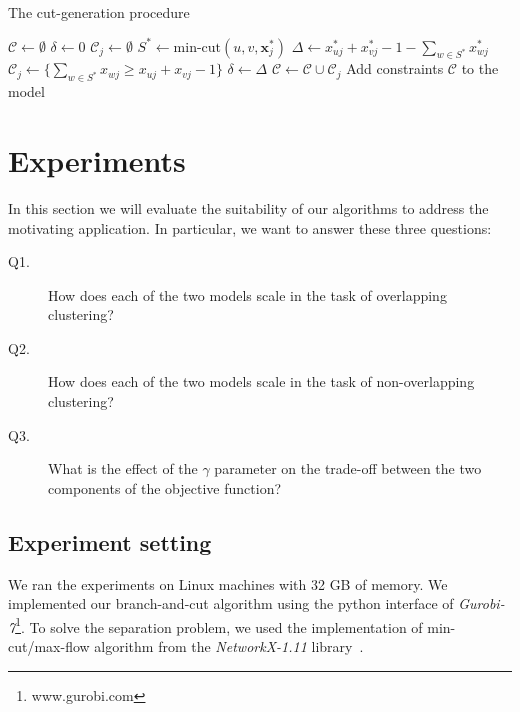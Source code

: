 \documentclass[conference]{IEEEtran}
\begin{document}
\begin{algorithm}
\centering
\caption{The cut-generation procedure}
\label{alg:cut}
\begin{algorithmic}[1]
\State $\mathcal{C} \gets \emptyset$
	\State $\delta \gets 0$
	\State $\mathcal{C}_j \gets \emptyset$	
		\State $S^* \gets \text{min-cut}(u, v, {\mathbf{x}}^{*}_j)$ 
		\State $\Delta \gets x_{uj}^* + x_{vj}^* - 1 - \sum_{w \in S^*} x_{wj}^*$
		\If{$\Delta > \delta$ }
			\State $\mathcal{C}_j \gets \{\sum_{w \in S^*} x_{wj} \geq x_{uj} + x_{vj} - 1\}$
			\State $\delta \gets \Delta$			
		\EndIf
	\EndFor
	\State $\mathcal{C} \gets \mathcal{C} \cup \mathcal{C}_j$
\EndFor
\State Add constraints $\mathcal{C}$ to the model
\end{algorithmic}
\end{algorithm}





\section{Experiments}
\label{sec:experiments}

In this section we will evaluate the suitability of our algorithms to address the motivating application. In particular, we want to answer these three questions:

\begin{description}
\item[Q1.] How does each of the two models scale in the task of overlapping clustering?
\item[Q2.] How does each of the two models scale in the task of non-overlapping clustering?
\item[Q3.] What is the effect of the $\gamma$ parameter on the trade-off between the two components of the objective function?
\end{description}


\subsection{Experiment setting}
We ran the experiments on Linux machines with 32 GB of memory. We implemented our branch-and-cut algorithm using the python interface
of \emph{Gurobi-7}\footnote{www.gurobi.com}. To solve the separation problem, we used the implementation of min-cut/max-flow algorithm from the \emph{NetworkX-1.11} library~\cite{NetworkX}. 
\end{document}
